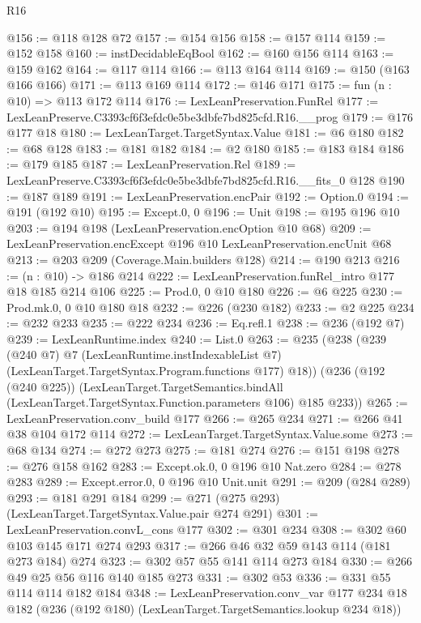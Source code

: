 \begin{lexlean}{R16}
\begin{coremodule}
@156 := @118 @128 @72
@157 := @154 @156
@158 := @157 @114
@159 := @152 @158
@160 := instDecidableEqBool
@162 := @160 @156 @114
@163 := @159 @162
@164 := @117 @114
@166 := @113 @164 @114
@169 := @150 (@163 @166 @166)
@171 := @113 @169 @114
@172 := @146 @171
@175 := fun (n : @10) => @113 @172 @114
@176 := LexLeanPreservation.FunRel
@177 := LexLeanPreserve.C3393cf6f3efdc0e5be3dbfe7bd825cfd.R16.__prog
@179 := @176 @177 @18
@180 := LexLeanTarget.TargetSyntax.Value
@181 := @6 @180
@182 := @68 @128
@183 := @181 @182
@184 := @2 @180
@185 := @183 @184
@186 := @179 @185
@187 := LexLeanPreservation.Rel
@189 := LexLeanPreserve.C3393cf6f3efdc0e5be3dbfe7bd825cfd.R16.__fits_0 @128
@190 := @187 @189
@191 := LexLeanPreservation.encPair
@192 := Option.{0}
@194 := @191 (@192 @10)
@195 := Except.{0, 0}
@196 := Unit
@198 := @195 @196 @10
@203 := @194 @198 (LexLeanPreservation.encOption @10 @68)
@209 := LexLeanPreservation.encExcept @196 @10 LexLeanPreservation.encUnit @68
@213 := @203 @209 (Coverage.Main.builders @128)
@214 := @190 @213
@216 := (n : @10) -> @186 @214
@222 := LexLeanPreservation.funRel_intro @177 @18 @185 @214 @106
@225 := Prod.{0, 0} @10 @180
@226 := @6 @225
@230 := Prod.mk.{0, 0} @10 @180 @18
@232 := @226 (@230 @182)
@233 := @2 @225
@234 := @232 @233
@235 := @222 @234
@236 := Eq.refl.{1}
@238 := @236 (@192 @7)
@239 := LexLeanRuntime.index
@240 := List.{0}
@263 := @235
    (@238
      (@239
        (@240 @7)
        @7
        (LexLeanRuntime.instIndexableList @7)
        (LexLeanTarget.TargetSyntax.Program.functions @177)
        @18))
    (@236
      (@192 (@240 @225))
      (LexLeanTarget.TargetSemantics.bindAll
        (LexLeanTarget.TargetSyntax.Function.parameters @106)
        @185
        @233))
@265 := LexLeanPreservation.conv_build @177
@266 := @265 @234
@271 := @266 @41 @38 @104 @172 @114
@272 := LexLeanTarget.TargetSyntax.Value.some
@273 := @68 @134
@274 := @272 @273
@275 := @181 @274
@276 := @151 @198
@278 := @276 @158 @162
@283 := Except.ok.{0, 0} @196 @10 Nat.zero
@284 := @278 @283
@289 := Except.error.{0, 0} @196 @10 Unit.unit
@291 := @209 (@284 @289)
@293 := @181 @291 @184
@299 := @271 (@275 @293) (LexLeanTarget.TargetSyntax.Value.pair @274 @291)
@301 := LexLeanPreservation.convL_cons @177
@302 := @301 @234
@308 := @302 @60 @103 @145 @171 @274 @293
@317 := @266 @46 @32 @59 @143 @114 (@181 @273 @184) @274
@323 := @302 @57 @55 @141 @114 @273 @184
@330 := @266 @49 @25 @56 @116 @140 @185 @273
@331 := @302 @53
@336 := @331 @55 @114 @114 @182 @184
@348 := LexLeanPreservation.conv_var
    @177
    @234
    @18
    @182
    (@236 (@192 @180) (LexLeanTarget.TargetSemantics.lookup @234 @18))

\end{coremodule}
\end{lexlean}
